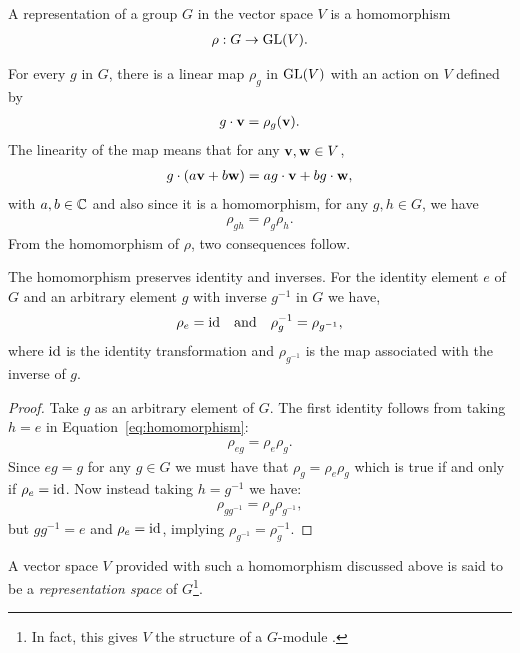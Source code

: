 \begin{definition}[Representation]\cite{Serre}
	A representation of a group $G$ in the vector space $V$ is a homomorphism
	\begin{align}\label{eq:DefRepr}
		\rho: G \rightarrow \text{GL}(V).
	\end{align}
\end{definition}
For every $g$ in $G$, there is a linear map $\rho_g$ in $\text{GL}(V)$ with an action on $V$ defined by 
\begin{align*}
	g \cdot \mathbf{v} = \rho_g (\mathbf{v}).
\end{align*}
The linearity of the map means that for any $\mathbf{v}, \mathbf{w} \in V$,
\begin{align}\label{eq:linearityOfg}
	g \cdot (a\mathbf{v} + b\mathbf{w}) = ag\cdot\mathbf{v} + bg\cdot\mathbf{w},
\end{align} 
with $a,b \in \mathbb{C}$ and also since it is a homomorphism, for any $g,h \in G$, we have
\begin{align}\label{eq:homomorphism}
	\rho_{gh} = \rho_g \rho_h.
\end{align}
From the homomorphism of $\rho$, two consequences follow.
\begin{proposition}\label{prop:homoidinv}
	The homomorphism preserves identity and inverses. For the identity element $e$ of $G$ and an arbitrary element $g$ with inverse $g^{-1}$ in $G$ we have,
	\begin{align}\label{eq:rhoIdAndInv}
		\rho_e = \text{id} \quad \text{and} \quad \rho_g^{-1} = \rho_{g^{-1}},
	\end{align}
	where $\text{id}$ is the identity transformation and $\rho_{g^{-1}}$ is the map associated with the inverse of $g$.
\end{proposition}
\begin{proof}
	Take $g$ as an arbitrary element of $G$. The first identity follows from taking $h=e$ in Equation~\ref{eq:homomorphism}:
	\begin{align*}
		\rho_{eg} = \rho_e \rho_g.
	\end{align*}
	Since $eg=g$ for any $g\in G$ we must have that $\rho_g = \rho_e\rho_g$ which is true if and only if $\rho_e = \text{id}$. Now instead taking $h=g^{-1}$ we have:
	\begin{align*}
		\rho_{gg^{-1}} = \rho_g \rho_{g^{-1}},
	\end{align*}
	but $gg^{-1} = e$ and $\rho_e = \text{id}$, implying $\rho_{g^{-1}} = \rho_g^{-1}$.
\end{proof}

\begin{notation}
	A vector space $V$ provided with such a homomorphism discussed above is said to be a \textit{representation space} of $G$\footnote{In fact, this gives $V$ the structure of a $G$-module \cite[1.3]{Sagan}.}.
\end{notation}


